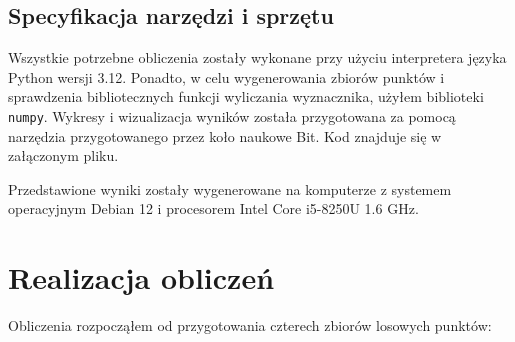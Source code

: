 \documentclass[11pt,a4paper]{article}
\begin{document}
\subsection{Specyfikacja narzędzi i sprzętu}
Wszystkie potrzebne obliczenia zostały wykonane
przy użyciu interpretera języka Python wersji 3.12.
Ponadto, w celu wygenerowania zbiorów punktów 
i sprawdzenia bibliotecznych funkcji wyliczania
wyznacznika, użyłem biblioteki \verb|numpy|.
Wykresy i wizualizacja wyników została przygotowana
za pomocą narzędzia przygotowanego przez koło naukowe
Bit. Kod znajduje się w załączonym pliku.

Przedstawione wyniki zostały wygenerowane na komputerze
z systemem operacyjnym Debian 12 i procesorem Intel Core i5-8250U 1.6 GHz.

\pagebreak

\section{Realizacja obliczeń}

Obliczenia rozpocząłem od przygotowania czterech zbiorów losowych punktów:
\end{document}
